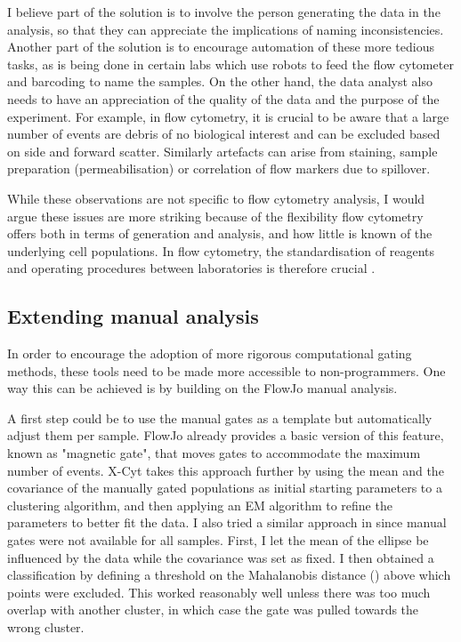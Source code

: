 I believe part of the solution is to involve the person generating the data in the analysis, so that they can appreciate the implications of naming inconsistencies.
Another part of the solution is to encourage automation of these more tedious tasks, as is being done in certain labs which use robots to feed the flow cytometer and barcoding to name the samples.
On the other hand, the data analyst also needs to have an appreciation of the quality of the data and the purpose of the experiment.
For example, in flow cytometry, it is crucial to be aware that a large number of events are debris of no biological interest and can be excluded based on side and forward scatter.
Similarly artefacts can arise from staining, sample preparation (permeabilisation) or correlation of flow markers due to spillover.

While these observations are not specific to flow cytometry analysis, I would argue these issues are more striking because of the flexibility flow cytometry offers both in terms of generation and analysis, and how little is known of the underlying cell populations.
In flow cytometry, the standardisation of reagents and operating procedures between laboratories is therefore crucial \citep{Maecker:2012gl}.

\subsection{Extending manual analysis}

In order to encourage the adoption of more rigorous computational gating methods, these tools need to be made more accessible to non-programmers.
One way this can be achieved is by building on the FlowJo manual analysis.


A first step could be to use the manual gates as a template but automatically adjust them per sample.
FlowJo already provides a basic version of this feature, known as "magnetic gate", that moves gates to accommodate the maximum number of events.
X-Cyt \citep{Hu:2013bg} takes this approach further by using the mean and the covariance of the manually gated populations as initial starting parameters to a clustering algorithm, and then applying an \gls{EM} algorithm to refine the parameters to better fit the data.
I also tried a similar approach in  since manual gates were not available for all samples.
First, I let the mean of the ellipse be influenced by the data while the covariance was set as fixed.
I then obtained a classification by defining a threshold on the Mahalanobis distance () above which points were excluded.
This worked reasonably well unless there was too much overlap with another cluster, in which case the gate was pulled towards the wrong cluster.

